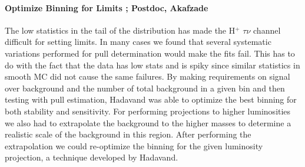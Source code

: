
\paragraph{Optimize Binning for Limits ;  Postdoc, Akafzade} %
The low statistics in the tail of the distribution has made the H$^+$ \too $\tau \nu$ channel difficult for setting limits.  In many cases we found that several systematic variations performed for pull determination would make the fits fail.  
This has to do with the fact that the data has low stats and is spiky since similar statistics in smooth MC did not cause the same failures. 
By making requirements on signal over background and the number of total background in a given
bin and then testing with pull estimation, Hadavand was able to optimize the best binning for both stability and sensitivity.  For performing projections to higher luminosities we also had to extrapolate the background to the higher masses
to determine a realistic scale of the background in this region. After performing the extrapolation we could re-optimize the binning for the given luminosity projection, a technique developed by Hadavand.


